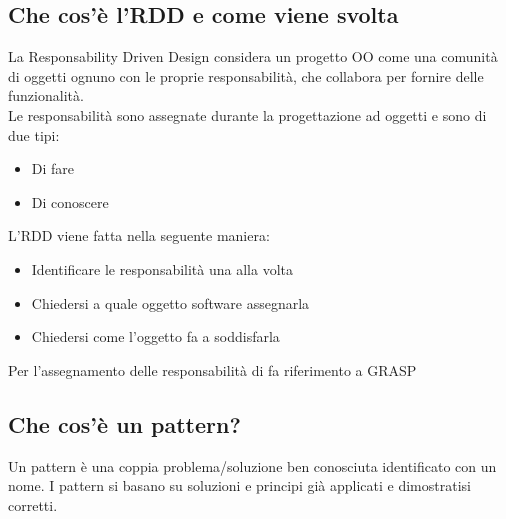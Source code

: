\documentclass[12pt, a4paper, openany]{book}
\begin{document}
\subsection*{Che cos'è l'RDD e come viene svolta}
La Responsability Driven Design considera un progetto OO come una comunità di oggetti
ognuno con le proprie responsabilità, che collabora per fornire delle funzionalità.\\
Le responsabilità sono assegnate durante la progettazione ad oggetti e sono di due tipi:
\begin{itemize}
    \item Di fare
    \item Di conoscere
\end{itemize}
L'RDD viene fatta nella seguente maniera:
\begin{itemize}
    \item Identificare le responsabilità una alla volta
    \item Chiedersi a quale oggetto software assegnarla
    \item Chiedersi come l'oggetto fa a soddisfarla
\end{itemize}
Per l'assegnamento delle responsabilità di fa riferimento a GRASP

\subsection*{Che cos'è un pattern?}
Un pattern è una coppia problema/soluzione ben conosciuta identificato
con un nome. I pattern si basano su soluzioni e principi già applicati e dimostratisi corretti.
\end{document}
